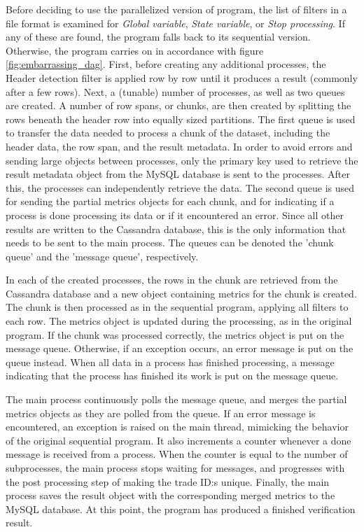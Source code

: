 Before deciding to use the parallelized version of program, the list of filters in a file format is examined for \textit{Global variable}, \textit{State variable}, or \textit{Stop processing}. If any of these are found, the
program falls back to its sequential version. Otherwise, the program carries on in accordance with figure \ref{fig:embarrassing_dag}. First, before creating any additional processes, the Header detection filter
is applied row by row until it produces a result (commonly after a few rows). Next, a (tunable) number of processes, as well as two queues are created. A number of row spans, or chunks, are then created by splitting
the rows beneath the header row into equally sized partitions. The first queue is used to transfer the data needed to process a chunk of the dataset, including the header data, the row span, and the result metadata.
In order to avoid errors and sending large objects between processes, only the primary key used to retrieve the result metadata object from the MySQL database is sent to the processes.
After this, the processes can independently retrieve the data. The second queue is used for sending the partial metrics objects for each chunk, and for indicating if a process is done processing
its data or if it encountered an error. Since all other results are written to the Cassandra database, this is the only information that needs to be sent to the main process. The queues can be
denoted the 'chunk queue' and the 'message queue', respectively.

In each of the created processes, the rows in the chunk are retrieved from the Cassandra database and a new object containing metrics for the chunk is created. The chunk is then processed as in the sequential program,
applying all filters to each row. The metrics object is updated during the processing, as in the original program. If the chunk was processed correctly, the metrics object is put on the message queue. Otherwise,
if an exception occurs, an error message is put on the queue instead. When all data in a process has finished processing, a message indicating that the process has finished its work is put on the message queue.

The main process continuously polls the message queue, and merges the partial metrics objects as they are polled from the queue. If an error message is encountered, an exception is raised on the main thread, mimicking the
behavior of the original sequential program. It also increments a counter whenever a done message is received from a process. When the counter is equal to the number of subprocesses, the main process stops waiting
for messages, and progresses with the post processing step of making the trade ID:s unique. Finally, the main process saves the result object with the corresponding merged metrics to the MySQL database. At this point,
the program has produced a finished verification result.


